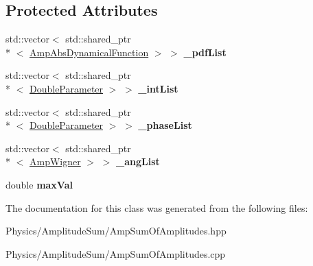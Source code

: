 \subsection*{Protected Attributes}
\begin{DoxyCompactItemize}
\item 
\hypertarget{class_amp_sum_of_amplitudes_abce84ba0526d987145e73b66854c23be}{std\-::vector$<$ std\-::shared\-\_\-ptr\\*
$<$ \hyperlink{class_amp_abs_dynamical_function}{Amp\-Abs\-Dynamical\-Function} $>$ $>$ {\bfseries \-\_\-pdf\-List}}\label{class_amp_sum_of_amplitudes_abce84ba0526d987145e73b66854c23be}

\item 
\hypertarget{class_amp_sum_of_amplitudes_aeacd8c6289bb13006a6bb5ebb87a3649}{std\-::vector$<$ std\-::shared\-\_\-ptr\\*
$<$ \hyperlink{class_double_parameter}{Double\-Parameter} $>$ $>$ {\bfseries \-\_\-int\-List}}\label{class_amp_sum_of_amplitudes_aeacd8c6289bb13006a6bb5ebb87a3649}

\item 
\hypertarget{class_amp_sum_of_amplitudes_a4fb6f6f7024be7bec8ba2b3707c9b1cb}{std\-::vector$<$ std\-::shared\-\_\-ptr\\*
$<$ \hyperlink{class_double_parameter}{Double\-Parameter} $>$ $>$ {\bfseries \-\_\-phase\-List}}\label{class_amp_sum_of_amplitudes_a4fb6f6f7024be7bec8ba2b3707c9b1cb}

\item 
\hypertarget{class_amp_sum_of_amplitudes_a8af3b5a2e4a5bcf2d7da97239445d1c5}{std\-::vector$<$ std\-::shared\-\_\-ptr\\*
$<$ \hyperlink{class_amp_wigner}{Amp\-Wigner} $>$ $>$ {\bfseries \-\_\-ang\-List}}\label{class_amp_sum_of_amplitudes_a8af3b5a2e4a5bcf2d7da97239445d1c5}

\item 
\hypertarget{class_amp_sum_of_amplitudes_aa982dc609e1e35765ce6172cef895f90}{double {\bfseries max\-Val}}\label{class_amp_sum_of_amplitudes_aa982dc609e1e35765ce6172cef895f90}

\end{DoxyCompactItemize}


The documentation for this class was generated from the following files\-:\begin{DoxyCompactItemize}
\item 
Physics/\-Amplitude\-Sum/Amp\-Sum\-Of\-Amplitudes.\-hpp\item 
Physics/\-Amplitude\-Sum/Amp\-Sum\-Of\-Amplitudes.\-cpp\end{DoxyCompactItemize}
